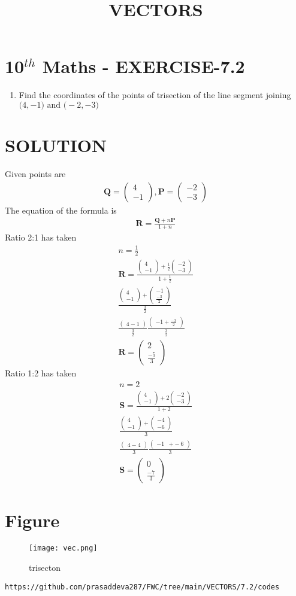 \documentclass[12pt]{article}
\newcommand{\myvec}[1]{\ensuremath{\begin{pmatrix}#1\end{pmatrix}}}
\let\vec\mathbf
\begin{document}
\begin{center}
\title{\textbf{VECTORS}}
\date{\vspace{-5ex}} %
\maketitle
\end{center}

\section{10$^{th}$ Maths - EXERCISE-7.2}

\begin{enumerate}
\item Find the coordinates of the points of trisection of the line segment joining $\vec(4 ,-1) \text{ and } \vec(-2,-3)$ 
\end{enumerate}

\section{SOLUTION}
Given points are
\begin{align}
\vec{Q}=\myvec{4\\ -1} ,
\vec{P}=\myvec{-2\\ -3}
\end{align}
The equation of the formula is
\begin{align}
\vec{R}=\frac{\vec{Q}+n\vec{P}}{1+n}
\end{align}
Ratio 2:1 has taken 
\begin{align}
n=\frac{1}{2}\\
\vec{R}=\frac{\myvec{4\\-1}+\frac{1}{2}\myvec{-2\\-3}}{1+\frac{1}{2}} \\
\frac{\myvec{4\\-1}+\myvec{-1\\ \frac{-3}{2}}}{\frac{3}{2}}\\
\frac{\myvec{4-1}}{\frac{3}{2}}\frac{\myvec{-1+\frac{-3}{2}}}{\frac{3}{2}}\\
\vec{R}=\myvec{2 \\ \frac{-5}{3}}
\end{align}
Ratio 1:2 has taken
\begin{align}
n=2\\
\vec{S}=\frac{\myvec{4\\ -1}+2\myvec{-2\\ -3}}{1+2} \\
\frac{\myvec{4\\ -1}+\myvec{-4\\ -6}}{3}\\
\frac{\myvec{4-4}}{3}\frac{\myvec{-1&+-6}}{3}\\
\vec{S}=\myvec{0\\ \frac{-7}{3}}
\end{align}

\section{Figure}
\begin{figure}[h]
\centering
\texttt{[image: vec.png]}
\caption{trisecton}
		\label{fig:Figure}
\end{figure}
\begin{lstlisting}
https://github.com/prasaddeva287/FWC/tree/main/VECTORS/7.2/codes
\end{lstlisting}
\end{document}
